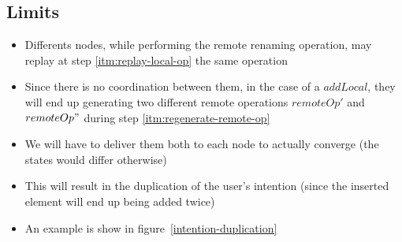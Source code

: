 \documentclass[a4paper]{article}
\begin{document}
\subsection{Limits}

\begin{itemize}
  \item Differents nodes, while performing the remote renaming operation,
    may replay at step \ref{itm:replay-local-op} the same operation
  \item Since there is no coordination between them, in the case of a $addLocal$,
    they will end up generating two different remote operations
    $remoteOp'$ and $remoteOp"$ during step \ref{itm:regenerate-remote-op}
  \item We will have to deliver them both to each node to actually converge
    (the states would differ otherwise)
  \item This will result in the duplication of the user's intention
    (since the inserted element will end up being added twice)
  \item An example is show in figure~\ref{intention-duplication}
\end{itemize}
\end{document}
